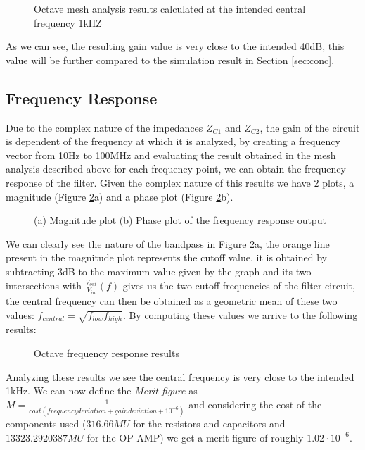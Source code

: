 \begin{figure}[h]
	\centering
	
	\caption{Octave mesh analysis results calculated at the intended central frequency 1kHZ}
	\label{fig:central_th}
\end{figure}

As we can see, the resulting gain value is very close to the intended 40dB, this value will be further compared to the simulation result in Section \ref{sec:conc}.

\pagebreak

\subsection{Frequency Response}
\hspace{12pt} Due to the complex nature of the impedances $Z_{C1}$ and $Z_{C2}$, the gain of the circuit is dependent of the frequency at which it is analyzed, by creating a frequency vector from 10Hz to 100MHz and evaluating the result obtained in the mesh analysis described above for each frequency point, we can obtain the frequency response of the filter. Given the complex nature of this results we have 2 plots, a magnitude (Figure \ref{fig:freq_th}a) and a phase plot (Figure \ref{fig:freq_th}b).

\vspace{10pt}
\begin{figure}[h]
	\centering
	\caption{(a) Magnitude plot (b) Phase plot of the frequency response output}
	\label{fig:freq_th}
\end{figure}

\vspace{10pt}
We can clearly see the nature of the bandpass in Figure \ref{fig:freq_th}a, the orange line present in the magnitude plot represents the cutoff value, it is obtained by subtracting 3dB to the maximum value given by the graph and its two intersections with $\frac{V_{out}}{V_{in}}(f)$ gives us the two cutoff frequencies of the filter circuit, the central frequency can then be obtained as a geometric mean of these two values: 
$f_{central} = \sqrt{f_{low} f_{high}}$. By computing these values we arrive to the following results:

\vspace{10pt}
\begin{figure}[h]
	\centering
	
	\caption{Octave frequency response results}
	\label{fig:freq_resp}
\end{figure}

Analyzing these results we see the central frequency is very close to the intended 1kHz. We can now define the \textit{Merit figure} as $M = \frac{1}{cost (frequency deviation + gain deviation + 10^{-6})}$ and considering the cost of the components used ($316.66MU$ for the resistors and capacitors and $13323.2920387MU$ for the OP-AMP) we get a merit figure of roughly $1.02 \cdot 10^{-6}$.

\pagebreak
